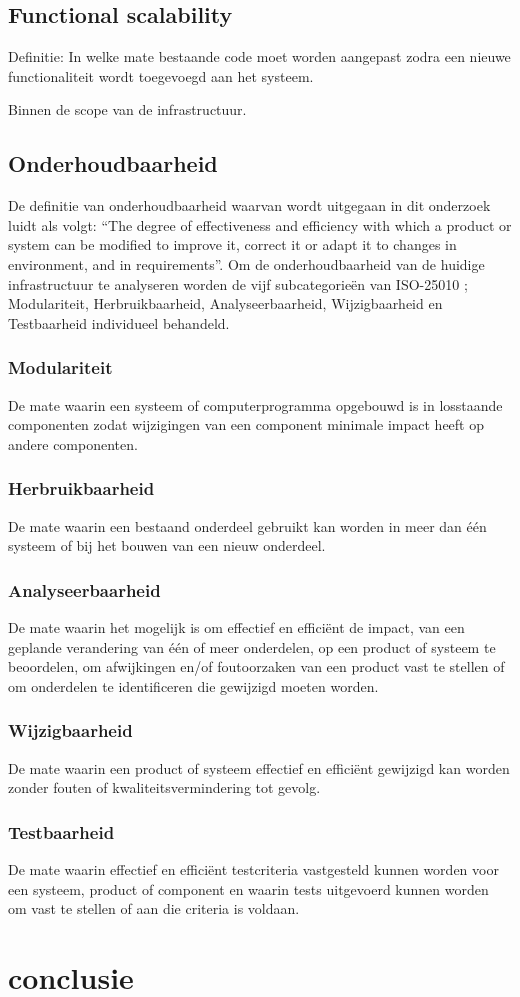 \subsection{Functional scalability}
Definitie: In welke mate bestaande code moet worden aangepast zodra een nieuwe functionaliteit wordt toegevoegd aan het systeem.

Binnen de scope van de infrastructuur.

\subsection{Onderhoudbaarheid}
De definitie van onderhoudbaarheid waarvan wordt uitgegaan in dit onderzoek luidt als volgt: \enquote{The degree of effectiveness and efficiency with which a product or system can be modified to improve it, correct it or adapt it to changes in environment, and in requirements}. Om de onderhoudbaarheid van de huidige infrastructuur te analyseren worden de vijf subcategorieën van ISO-25010 \parencite{ISO25010}; Modulariteit, Herbruikbaarheid, Analyseerbaarheid, Wijzigbaarheid en Testbaarheid individueel behandeld.

\subsubsection{Modulariteit}
De mate waarin een systeem of computerprogramma opgebouwd is in losstaande componenten zodat wijzigingen van een component minimale impact heeft op andere componenten.

\subsubsection{Herbruikbaarheid}
De mate waarin een bestaand onderdeel gebruikt kan worden in meer dan één systeem of bij het bouwen van een nieuw onderdeel.

\subsubsection{Analyseerbaarheid}
De mate waarin het mogelijk is om effectief en efficiënt de impact, van een geplande verandering van één of meer onderdelen, op een product of systeem te beoordelen, om afwijkingen en/of foutoorzaken van een product vast te stellen of om onderdelen te identificeren die gewijzigd moeten worden.

\subsubsection{Wijzigbaarheid}
De mate waarin een product of systeem effectief en efficiënt gewijzigd kan worden zonder fouten of kwaliteitsvermindering tot gevolg.

\subsubsection{Testbaarheid}
De mate waarin effectief en efficiënt testcriteria vastgesteld kunnen worden voor een systeem, product of component en waarin tests uitgevoerd kunnen worden om vast te stellen of aan die criteria is voldaan.


\section{conclusie}
